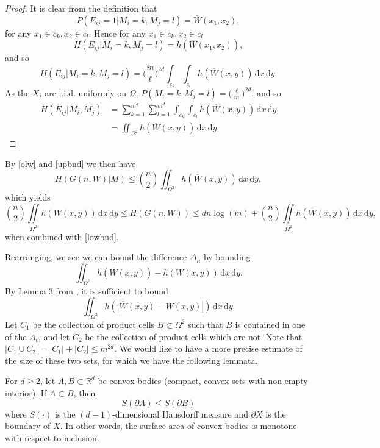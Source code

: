 \documentclass{svproc}
\newcommand{\1}{\mathbbm{1}}
\newcommand{\K}{\Omega}
\newcommand{\rr}{\mathbb{R}}
\newcommand{\ol}[1]{\overline{#1}}
\newcommand{\dd}{\,\mathrm{d}}
\begin{document}
\begin{proof}
It is clear from the definition that
\begin{equation}P(E_{ij}=1|M_i=k, M_j=l) = \ol{W}(x_1,x_2),\end{equation}
for any $x_1\in c_k, x_2\in c_l$. Hence for any $x_1\in c_k, x_2\in c_l$
\begin{equation}
H(E_{ij}|M_i = k, M_j = l) = h(\ol{W}(x_1,x_2)),
\end{equation}
and so
\[
H(E_{ij}|M_i=k,M_j=l) = \Big(\frac{m}{\ell}\Big)^{2d}\int_{c_k}\int_{c_l}h(\ol{W}(x,y))\dd x\dd y.
\]
As the $X_i$ are i.i.d. uniformly on $\K$, $P(M_i = k, M_j=l) = \Big(\frac{\ell}{m}\Big)^{2d}$, and so
\begin{align}
H(E_{ij}|M_i,M_j) &=\sum_{k=1}^{m^d}\sum_{l=1}^{m^d}\int_{c_k}\int_{c_l}h(\ol{W}(x,y))\dd x\dd y\\
&= \iint_{\K^2}h(\ol{W}(x,y))\dd x\dd y.
\end{align}
\end{proof}

By \cref{olw} and \cref{upbnd} we then have
\begin{equation}
H(G(n,W)|M)\leq\binom{n}{2}\iint_{\K^2}h(\ol{W}(x,y))\dd x\dd y,
\end{equation}
which yields
\begin{equation*}\binom{n}{2}\iint\limits_{\K^2}h(W(x,y))\dd x\dd y\leq H(G(n,W))\leq dn\log(m)+\binom{n}{2}\iint\limits_{\K^2}h(\ol{W}(x,y))\dd x\dd y,\end{equation*}
when combined with \cref{lowbnd}.

Rearranging, we see we can bound the difference $\Delta_n$ by bounding
\begin{equation}\label{int}
\iint_{\K^2} h(\ol{W}(x,y))-h(W(x,y))\dd x\dd y.
\end{equation}
By Lemma 3 from \cite{bakerpaper}, it is sufficient to bound
\begin{equation}\iint_{\K^2}h(|\ol{W}(x,y)-W(x,y)|)\dd x\dd y.\end{equation}
Let $C_1$ be the collection of product cells $B\subset\K^2$ such that $B$ is contained in one of the $A_t$, and let $C_2$ be the collection of product cells which are not. Note that $|C_1\cup C_2|=|C_1|+|C_2| \leq m^{2d}$. We would like to have a more precise estimate of the size of these two sets, for which we have the following lemmata.
\begin{lemma}
For $d\geq 2$, let $A,B\subset\rr^d$ be convex bodies (compact, convex sets with non-empty interior). If $A\subset B$, then
\begin{equation}S(\partial A)\leq S(\partial B)\end{equation}
where $S(\cdot)$ is the $(d-1)$-dimensional Hausdorff measure and $\partial X$ is the boundary of $X$. In other words, the surface area of convex bodies is monotone with respect to inclusion.
\end{lemma}
\end{document}
